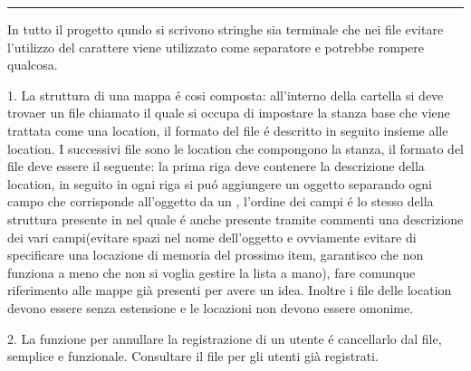 \documentclass[12pt]{article}
\begin{document}
\par\noindent\rule{\textwidth}{0.1pt}
{
\footnotesize
In tutto il progetto qundo si scrivono stringhe sia terminale che nei file evitare l'utilizzo del carattere  viene utilizzato come separatore e potrebbe rompere qualcosa.

1. La struttura di una mappa é cosi composta: all'interno della cartella si deve trovaer un file chiamato  il quale si occupa di impostare la stanza base che viene trattata come una location, il formato del file é descritto in seguito insieme alle location. I successivi file sono le location che compongono la stanza, il formato del file deve essere il seguente: la prima riga deve contenere la descrizione della location, in seguito in ogni riga si puó aggiungere un oggetto separando ogni campo che corrisponde all'oggetto da un , l'ordine dei campi é lo stesso della struttura presente in  nel quale é anche presente tramite commenti una descrizione dei vari campi(evitare spazi nel nome dell'oggetto e ovviamente evitare di specificare una locazione di memoria del prossimo item, garantisco che non funziona a meno che non si voglia gestire la lista a mano), fare comunque riferimento alle mappe già presenti per avere un idea. Inoltre i file delle location devono essere senza estensione e le locazioni non devono essere omonime.

2. La funzione per annullare la registrazione di un utente é cancellarlo dal file, semplice e funzionale. Consultare il file  per gli utenti già registrati. 
}
\end{document}
